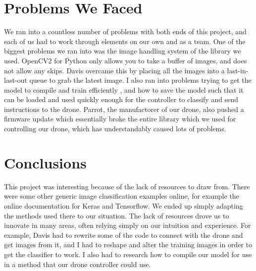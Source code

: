 \documentclass[12pt]{article}
\begin{document}
\section{Problems We Faced}
{
	We ran into a countless number of problems with both ends of this project, and each of us had to work through elements on our own and as a team.
	One of the biggest problems we ran into was the image handling system of the library we used. 
	OpenCV2 for Python only allows you to take a buffer of images, and does not allow any skips. 
	Davis overcame this by placing all the images into a last-in-last-out queue to grab the latest image.  
	I also ran into problems trying to get the model to compile and train efficiently , and how to save the model such that it can be loaded and used quickly enough for the controller to classify and send instructions to the drone. 
	Parrot, the manufactorer of our drone, also pushed a firmware update which essentially broke the entire library which we used for controlling our drone, which has understandably caused lots of problems. 
}

\section{Conclusions}
{
	This project was interesting because of the lack of resources to draw from.
	There were some other generic image classification examples online, for example the online documentation for Keras and Tensorflow. 
	We ended up simply adapting the methods used there to our situation. 
	The lack of resources drove us to innovate in many areas, often relying simply on our intuition and experience. 
	For example, Davis had to rewrite some of the code to connect with the drone and get images from it, and I had to reshape and alter the training images in order to get the classifier to work. 
	I also had to research how to compile our model for use in a method that our drone controller could use.
}
\end{document}

